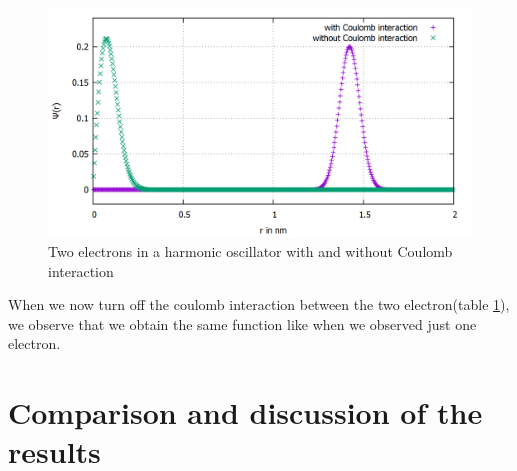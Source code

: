 \documentclass[10pt,a4paper]{article}
\begin{document}
\begin{figure}[h]
	\includegraphics[scale = 0.25]{k1_comparison_2El_n500.png}
	\centering
	\caption{Two electrons in a harmonic oscillator with and without Coulomb interaction}
	\label{plot2elrcoulomb}
\end{figure}

When we now turn off the coulomb interaction between the two electron(table \ref{plot2elrcoulomb}), we observe that we obtain the same function like when we observed just one electron.









\section{Comparison and discussion of the results}
\end{document}
